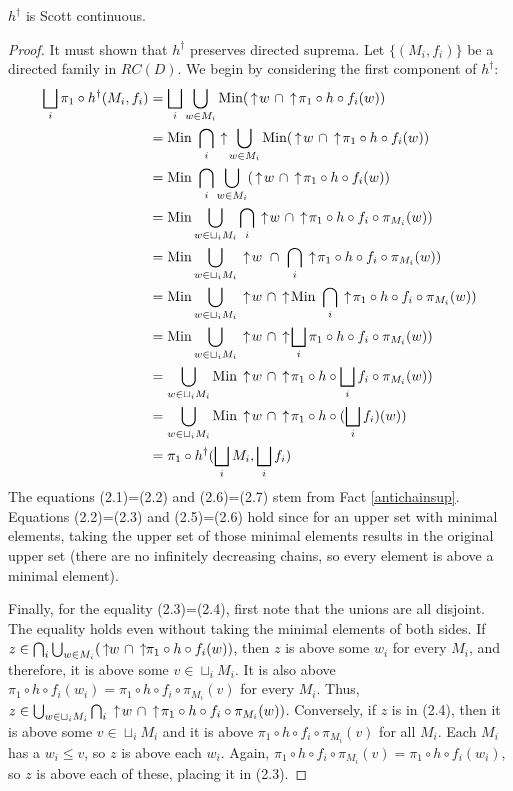 \begin{theorem}
$h^{\dagger}$ is Scott continuous.
\end{theorem}
\begin{proof}
It must shown that $h^{\dagger}$ preserves directed suprema.  Let $\{(M_i, f_i)\}$ be a directed family in $RC(D)$.  We begin by considering the first component of $h^\dagger$:
\begin{align}
\bigsqcup_i \pi_1 \circ h^{\dagger}(M_i, f_i) 
&= \bigsqcup_i \bigcup_{w\in M_i} \Min (\ua w\ \cap \ua \pi_1 \circ h\circ f_i(w)) \\
&= \Min\ \bigcap_i \ua \bigcup_{w\in M_i} \Min (\ua w\ \cap \ua \pi_1 \circ h\circ f_i(w)) \\
&= \Min\ \bigcap_i \bigcup_{w\in M_i} (\ua w\ \cap \ua \pi_1 \circ h\circ f_i(w)) \\
&= \Min \bigcup_{w\in \sqcup_i M_i} \bigcap_i \ua w\ \cap \ua \pi_1 \circ h\circ f_i\circ \pi_{M_i}(w)) \\
&= \Min \bigcup_{w\in \sqcup_i M_i} \ua w\ \cap\ \bigcap_i \ua \pi_1 \circ h\circ f_i\circ \pi_{M_i}(w)) \\
&= \Min \bigcup_{w\in \sqcup_i M_i} \ua w\ \cap \ua \Min\ \bigcap_i \ua \pi_1 \circ h\circ f_i\circ \pi_{M_i}(w)) \\
&= \Min \bigcup_{w\in \sqcup_i M_i} \ua w\ \cap \ua \bigsqcup_i \pi_1 \circ h\circ f_i\circ \pi_{M_i}(w)) \\
&= \bigcup_{w\in \sqcup_i M_i} \Min \ua w\ \cap \ua \pi_1 \circ h\circ \bigsqcup_i f_i\circ \pi_{M_i}(w))\nonumber \\
&= \bigcup_{w\in \sqcup_i M_i} \Min \ua w\ \cap \ua \pi_1 \circ h\circ (\bigsqcup_i f_i)(w)) \nonumber\\
&= \pi_1 \circ h^{\dagger}(\bigsqcup_i M_i, \bigsqcup_i f_i) \nonumber
\end{align}
The equations (2.1)=(2.2) and (2.6)=(2.7) stem from Fact \ref{antichainsup}.  Equations (2.2)=(2.3) and (2.5)=(2.6) hold since for an upper set with minimal elements, taking the upper set of those minimal elements results in the original upper set (there are no infinitely decreasing chains, so every element is above a minimal element).  

Finally, for the equality (2.3)=(2.4), first note that the unions are all disjoint.  The equality holds even without taking the minimal elements of both sides.  If $z\in \bigcap_i \bigcup_{w\in M_i} (\,\uparrow\!\!w\ \cap \,\uparrow\!\!\pi_1 \circ h\circ f_i(w))$, then $z$ is above some $w_i$ for every $M_i$, and therefore, it is above some $v\in \sqcup_i M_i$.  It is also above $\pi_1 \circ h\circ f_i(w_i) = \pi_1 \circ h\circ f_i\circ \pi_{M_i}(v)$ for every $M_i$.  Thus, $z \in \bigcup_{w\in \sqcup_i M_i} \bigcap_i \,\uparrow\! w\ \cap \,\uparrow\! \pi_1 \circ h\circ f_i\circ \pi_{M_i}(w))$.  Conversely, if $z$ is in (2.4), then it is above some $v\in \sqcup_i M_i$ and it is above $\pi_1 \circ h\circ f_i\circ \pi_{M_i}(v)$ for all $M_i$.  Each $M_i$ has a $w_i \leq v$, so $z$ is above each $w_i$.  Again, $\pi_1 \circ h\circ f_i\circ \pi_{M_i}(v) = \pi_1 \circ h\circ f_i(w_i)$, so $z$ is above each of these, placing it in (2.3).


\end{proof}
